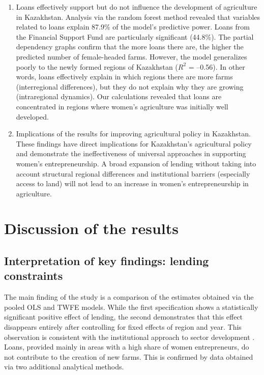 ﻿\documentclass[pdflatex,sn-mathphys-ay]{sn-jnl}
\begin{document}
\begin{enumerate}
\item Loans effectively support but do not influence the development of
agriculture in Kazakhstan. Analysis via the random forest method
revealed that variables related to loans explain 87.9\% of the model's
predictive power. Loans from the Financial Support Fund are particularly
significant (44.8\%). The partial dependency graphs confirm that the
more loans there are, the higher the predicted number of female-headed
farms. However, the model generalizes poorly to the newly formed regions
of Kazakhstan ($R^2$ = --0.56). In other words, loans effectively explain
in which regions there are more farms (interregional differences), but
they do not explain why they are growing (intraregional dynamics). Our
calculations revealed that loans are concentrated in regions where
women's agriculture was initially well developed.

\item Implications of the results for improving agricultural policy in
Kazakhstan. These findings have direct implications for Kazakhstan's
agricultural policy and demonstrate the ineffectiveness of universal
approaches in supporting women's entrepreneurship. A broad expansion of
lending without taking into account structural regional differences and
institutional barriers (especially access to land) will not lead to an
increase in women's entrepreneurship in agriculture.
\end{enumerate}

\section{Discussion of the results}

\subsection{Interpretation of key findings: lending constraints}

The main finding of the study is a comparison of the estimates obtained
via the pooled OLS and TWFE models. While the first specification
shows a statistically significant positive effect of lending, the second
demonstrates that this effect disappears entirely after controlling for
fixed effects of region and year. This observation is consistent with
the institutional approach to sector development \citep{ref78,ref90}. Loans, provided mainly in areas with a
high share of women entrepreneurs, do not contribute to the creation of
new farms. This is confirmed by data obtained via two additional
analytical methods.
\end{document}
